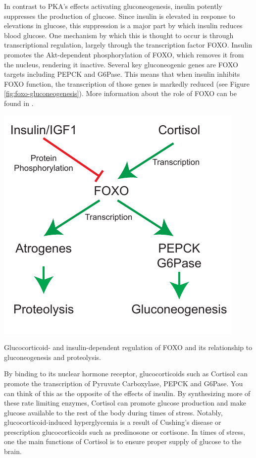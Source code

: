 \documentclass{tufte-handout}
\begin{document}
In contrast to PKA's effects activating gluconeogenesis, insulin potently suppresses the production of glucose.  Since insulin is elevated in response to elevations in glucose, this suppression is a major part by which insulin reduces blood glucose.  One mechanism by which this is thought to occur is through transcriptional regulation, largely through the transcription factor FOXO.  Insulin promotes the Akt-dependent phosphorylation of FOXO, which removes it from the nucleus, rendering it inactive.  Several key gluconeogenic genes are FOXO targets including PEPCK and G6Pase.  This means that when insulin inhibits FOXO function, the transcription of those genes is markedly reduced (see Figure \ref{fig:foxo-gluconeogenesis}).  More information about the role of FOXO can be found in \citet{Barthel2005}.

\begin{marginfigure}
\includegraphics{figures/foxo-gluconeogenesis.pdf}
\caption{Glucocorticoid- and insulin-dependent regulation of FOXO and its relationship to gluconeogenesis and proteolysis.}
\label{fig:foxo-gluconeogenesis}
\end{marginfigure}

  By binding to its nuclear hormone receptor, glucocorticoids such as Cortisol can promote the transcription of Pyruvate Carboxylase, PEPCK and G6Pase.  You can think of this as the opposite of the effects of insulin.  By synthesizing more of these rate limiting enzymes, Cortisol can promote glucose production and make glucose available to the rest of the body during times of stress.  Notably, glucocorticoid-induced hyperglycemia is a result of Cushing's disease or prescription glucocorticoids such as predinosone or cortisone.  In times of stress, one the main functions of Cortisol is to ensure proper supply of glucose to the brain.  
\end{document}
